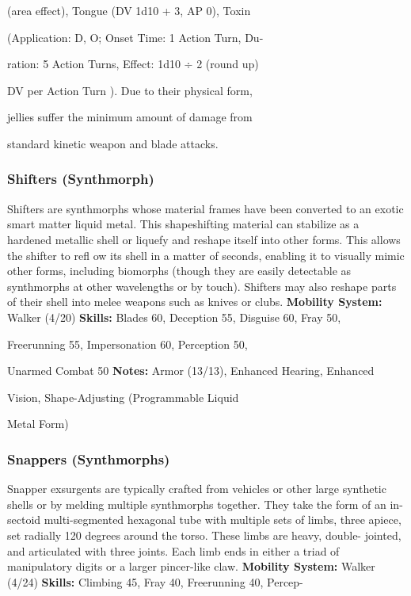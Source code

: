 (area effect), Tongue (DV 1d10 + 3, AP 0), Toxin 

(Application: D, O; Onset Time: 1 Action Turn, Du-

ration: 5 Action Turns, Effect: 1d10 ÷ 2 (round up) 

DV per Action Turn ). Due to their physical form, 

jellies suffer the minimum amount of damage from 

standard kinetic weapon and blade attacks. 

\subsubsection{Shifters (Synthmorph)}

Shifters are synthmorphs whose material frames have 
been converted to an exotic smart matter liquid metal. 
This shapeshifting material can stabilize as a hardened 
metallic shell or liquefy and reshape itself into other 
forms. This allows the shifter to refl ow its shell in a 
matter of seconds, enabling it to visually mimic other 
forms, including biomorphs (though they are easily 
detectable as synthmorphs at other wavelengths or by 
touch). Shifters may also reshape parts of their shell 
into melee weapons such as knives or clubs. 
\textbf{Mobility System: }Walker (4/20)
\textbf{Skills:} Blades 60, Deception 55, Disguise 60, Fray 50, 

Freerunning 55, Impersonation 60, Perception 50, 

Unarmed Combat 50 
\textbf{Notes: }Armor (13/13), Enhanced Hearing, Enhanced 

Vision, Shape-Adjusting (Programmable Liquid 

Metal Form)

\subsubsection{Snappers (Synthmorphs)}

Snapper exsurgents are typically crafted from vehicles 
or other large synthetic shells or by melding multiple 
synthmorphs together. They take the form of an in-
sectoid multi-segmented hexagonal tube with multiple 
sets of limbs, three apiece, set radially 120 degrees 
around the torso. These limbs are heavy, double-
jointed, and articulated with three joints. Each limb 
ends in either a triad of manipulatory digits or a larger 
pincer-like claw.
\textbf{Mobility System:} Walker (4/24)
\textbf{Skills:} Climbing 45, Fray 40, Freerunning 40, Percep-

